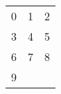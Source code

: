 \documentclass{article}
\begin{document}
\thispagestyle{empty}
\fontsize{36pt}{36pt}\selectfont
\begin{center}
\begin{tabular}{ccc}
0 & 1 & 2 \\
3 & 4 & 5 \\
6 & 7 & 8 \\
9 & \x & \e \\
\end{tabular}
\end{center}
\end{document}
